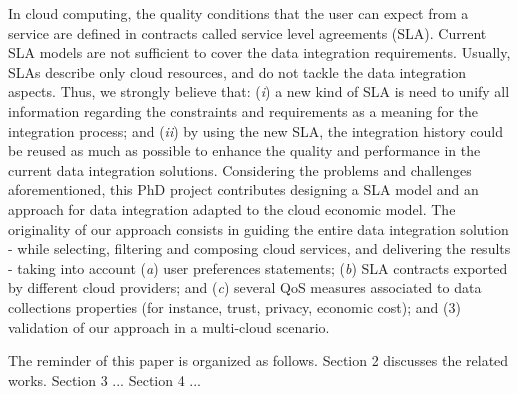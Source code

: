 In cloud computing, the quality conditions that the user can expect from a service are defined in contracts called service level agreements (SLA). 
%
Current SLA models are not sufficient to cover the data integration requirements. 
%
Usually, SLAs describe only cloud resources, and do not tackle the data integration aspects. 
%
Thus, we strongly believe that: 
(\textit{i}) a new kind of SLA is need to unify all information regarding the constraints and requirements as a meaning for the integration process; and 
(\textit{ii}) by using the new SLA, the integration history could be reused as much as possible to enhance the quality and performance in the current data integration solutions. 
%
Considering the problems and challenges aforementioned, this PhD project contributes designing a SLA model and an approach for data integration adapted to the cloud economic model. The originality of our approach consists in guiding the entire data integration solution - while selecting, filtering and composing cloud services, and delivering the results - taking into account (\textit{a}) user preferences statements; (\textit{b}) SLA contracts exported by different cloud providers; and (\textit{c}) several QoS measures associated to data collections properties (for instance, trust, privacy, economic cost); and (3) validation of our approach in a multi-cloud scenario.

The reminder of this paper is organized as follows.
Section 2 discusses the related works.
Section 3 ...
Section 4 ...
